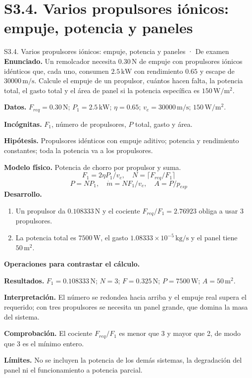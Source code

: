 \section{S3.4. Varios propulsores iónicos: empuje, potencia y paneles}
\begin{studiumworked}{S3.4. Varios propulsores iónicos: empuje, potencia y paneles · De examen}
\textbf{Enunciado.} Un remolcador necesita $0.30\,\mathrm N$ de empuje con propulsores iónicos idénticos que, cada uno, consumen $2.5\,\mathrm{kW}$ con rendimiento $0.65$ y escape de $30000\,\mathrm{m/s}$. Calcule el empuje de un propulsor, cuántos hacen falta, la potencia total, el gasto total y el área de panel si la potencia específica es $150\,\mathrm{W/m^2}$.

\textbf{Datos.} $F_{req}=0.30\,\mathrm N$; $P_1=2.5\,\mathrm{kW}$; $\eta=0.65$; $v_e=30000\,\mathrm{m/s}$; $150\,\mathrm{W/m^2}$.

\textbf{Incógnitas.} $F_1$, número de propulsores, $P$ total, gasto y área.

\textbf{Hipótesis.} Propulsores idénticos con empuje aditivo; potencia y rendimiento constantes; toda la potencia va a los propulsores.

\textbf{Modelo físico.} Potencia de chorro por propulsor y suma.
\[F_1=2\eta P_1/v_e,\quad N=\lceil F_{req}/F_1\rceil\]
\[P=NP_1,\quad \dot m=NF_1/v_e,\quad A=P/p_{esp}\]
\textbf{Desarrollo.}
\begin{enumerate}
\item Un propulsor da $0.108333\,\mathrm N$ y el cociente $F_{req}/F_1=2.76923$ obliga a usar $3$ propulsores.
\item La potencia total es $7500\,\mathrm W$, el gasto $1.08333\times10^{-5}\,\mathrm{kg/s}$ y el panel tiene $50\,\mathrm{m^2}$.
\end{enumerate}
\textbf{Operaciones para contrastar el cálculo.}

\textbf{Resultados.} $F_1=0.108333\,\mathrm N$; $N=3$; $F=0.325\,\mathrm N$; $P=7500\,\mathrm W$; $A=50\,\mathrm{m^2}$.

\textbf{Interpretación.} El número se redondea hacia arriba y el empuje real supera el requerido; con tres propulsores se necesita un panel grande, que domina la masa del sistema.

\textbf{Comprobación.} El cociente $F_{req}/F_1$ es menor que 3 y mayor que 2, de modo que 3 es el mínimo entero.

\textbf{Límites.} No se incluyen la potencia de los demás sistemas, la degradación del panel ni el funcionamiento a potencia parcial.
\end{studiumworked}
